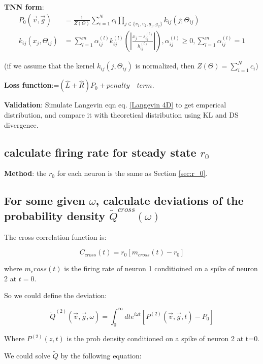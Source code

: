 \documentclass{article}
\begin{document}
	\textbf{TNN form}:
	\begin{align} P_0(\vec{v},\vec{g})&=\frac{1}{Z(\Theta)}\sum_{i=1}^{N}c_i\prod_{j\in\{v_1,v_2,g_1,g_2\}}k_{ij}(j;\Theta_{ij})\\
		k_{ij}(x_j,\Theta_{ij})&=\sum_{l=1}^m\alpha_{ij}^{(l)}k_{ij}^{(l)}(|\frac{x_j-s_{ij}^{(l)}}{h_{ij}^{(l)}}|),\alpha_{ij}^{(l)}\geq 0,\sum_{l=1}^m\alpha_{ij}^{(l)}=1
	\end{align}
	
	(if we assume that the kernel $k_{ij}(j,\Theta_{ij})$ is normalized, then $Z(\Theta)=\sum_{i=1}^{N}c_i$)
	
	\textbf{Loss function}:=$(\hat{L}+\hat{R})P_0+penalty \quad term$.
	
	\textbf{Validation}: Simulate Langevin eqn eq. \eqref{Langevin 4D} to get emperical distribution, and compare it with theoretical distribution using KL and DS divergence.
		
	\subsection{calculate firing rate for steady state $r_0$}
	
	\textbf{Method}: the $r_0$ for each neuron is the same as Section \ref{sec:r_0}.
	
	\subsection{For some given $\omega$, calculate deviations of the probability density $\tilde{Q}^{cross}(\omega)$}
	
	The cross correlation function is:
	
	\begin{equation}
	C_{cross}(t)=r_0[m_{cross}(t)-r_0]
	\end{equation}
	
	where $m_cross(t)$ is the firing rate of neuron 1 conditioined on a spike of neuron 2 at $t=0$.
	
	So we could define the deviation:
	
	\begin{equation}
		\tilde{Q}^{(2)}(\vec{v},\vec{g},\omega)=\int_{0}^{\infty}dte^{i\omega t}[P^{(2)}(\vec{v},\vec{g},t)-P_0]
	\end{equation}
	
	Where $P^{(2)}(z,t)$ is the prob density conditioned on a spike of neuron 2 at t=0.
	
	We could solve $\tilde{Q}$ by the following equation:
	
\end{document}
